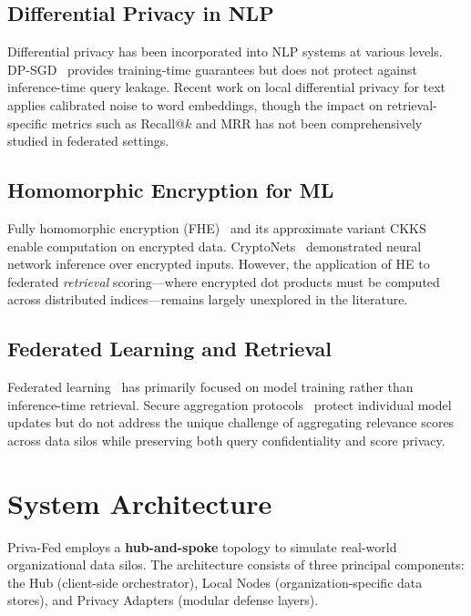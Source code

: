 \documentclass[conference]{IEEEtran}
\begin{document}
\subsection{Differential Privacy in NLP}

Differential privacy has been incorporated into NLP systems at various levels. DP-SGD~\cite{abadi2016deep} provides training-time guarantees but does not protect against inference-time query leakage. Recent work on local differential privacy for text~\cite{feyisetan2020privacy} applies calibrated noise to word embeddings, though the impact on retrieval-specific metrics such as Recall@$k$ and MRR has not been comprehensively studied in federated settings.

\subsection{Homomorphic Encryption for ML}

Fully homomorphic encryption (FHE)~\cite{gentry2009fully} and its approximate variant CKKS~\cite{cheon2017homomorphic} enable computation on encrypted data. CryptoNets~\cite{gilad2018cryptonets} demonstrated neural network inference over encrypted inputs. However, the application of HE to federated \textit{retrieval} scoring---where encrypted dot products must be computed across distributed indices---remains largely unexplored in the literature.

\subsection{Federated Learning and Retrieval}

Federated learning~\cite{mcmahan2017communication} has primarily focused on model training rather than inference-time retrieval. Secure aggregation protocols~\cite{bonawitz2017practical} protect individual model updates but do not address the unique challenge of aggregating relevance scores across data silos while preserving both query confidentiality and score privacy.

\section{System Architecture}
\label{sec:architecture}

Priva-Fed employs a \textbf{hub-and-spoke} topology to simulate real-world organizational data silos. The architecture consists of three principal components: the Hub (client-side orchestrator), Local Nodes (organization-specific data stores), and Privacy Adapters (modular defense layers).
\end{document}
